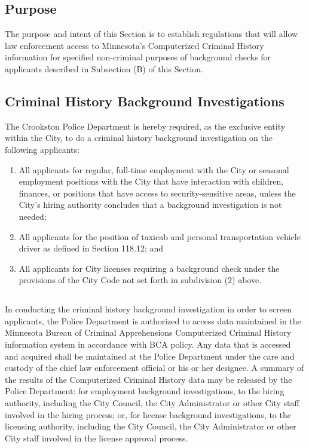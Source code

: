 \subsection{Purpose}
The purpose and intent of this Section is to establish regulations that will allow law enforcement access to Minnesota’s Computerized Criminal History information for specified non-criminal purposes of background checks for applicants described in Subsection (B) of this Section.
\subsection{Criminal History Background Investigations}
The Crookston Police Department is hereby required, as the exclusive entity within the City, to do a criminal history background investigation on the following applicants:
\begin{enumerate}[{\indent}1)]
    \item All applicants for regular, full-time employment with the City or seasonal employment positions with the City that have interaction with children, finances, or positions that have access to security-sensitive areas, unless the City’s hiring authority concludes that a background investigation is not needed;
    \item All applicants for the position of taxicab and personal transportation vehicle driver as defined in Section 118.12; and
    \item All applicants for City licenses requiring a background check under the provisions of the City Code not set forth in subdivision (2) above.
\end{enumerate}
\subsection{}
In conducting the criminal history background investigation in order to screen applicants, the Police Department is authorized to access data maintained in the Minnesota Bureau of Criminal Apprehensions Computerized Criminal History information system in accordance with BCA policy. Any data that is accessed and acquired shall be maintained at the Police Department under the care and custody of the chief law enforcement official or his or her designee. A summary of the results of the Computerized Criminal History data may be released by the Police Department: for employment background investigations, to the hiring authority, including the City Council, the City Administrator or other City staff involved in the hiring process; or, for license background investigations, to the licensing authority, including the City Council, the City Administrator or other City staff involved in the license approval process.
